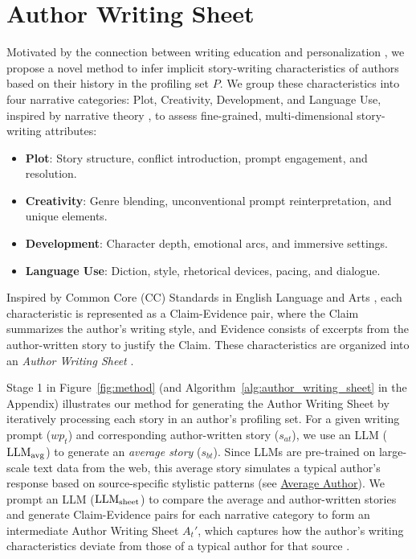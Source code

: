 \section{Author Writing Sheet}
\label{sec:author-writing-sheet}

Motivated by the connection between writing education and personalization \citep{li2023teach}, we propose a novel method to infer implicit story-writing characteristics of authors based on their history in the profiling set $P$. We group these characteristics into four narrative categories: Plot, Creativity, Development, and Language Use, inspired by narrative theory \citep{pavis1998dictionary, card1999characters, noble1994conflict, huot2024agents}, to assess fine-grained, multi-dimensional story-writing attributes:
\begin{itemize}[noitemsep, topsep=0pt]
    \item \textbf{Plot}: Story structure, conflict introduction, prompt engagement, and resolution.
    \item \textbf{Creativity}: Genre blending, unconventional prompt reinterpretation, and unique elements.
    \item \textbf{Development}: Character depth, emotional arcs, and immersive settings.
    \item \textbf{Language Use}: Diction, style, rhetorical devices, pacing, and dialogue.
\end{itemize}


Inspired by Common Core (CC) Standards in English Language and Arts \citep{national2010common}, each characteristic is represented as a Claim-Evidence pair, where the Claim summarizes the author's writing style, and Evidence consists of excerpts from the author-written story to justify the Claim. These characteristics are organized into an \emph{Author Writing Sheet} \citep{gurung-lapata-2024-chiron}.

Stage 1 in Figure~\ref{fig:method} (and Algorithm~\ref{alg:author_writing_sheet} in the Appendix) illustrates our method for generating the Author Writing Sheet by iteratively processing each story in an author's profiling set. For a given writing prompt ($wp_t$) and corresponding author-written story ($s_{at}$), we use an LLM (\(\text{LLM\textsubscript{avg}}\)) to generate an \emph{average story} ($s_{bt}$). Since LLMs are pre-trained on large-scale text data from the web, this average story simulates a typical author's response based on source-specific stylistic patterns 
(see \hyperlink{sec:avg-author}{Average Author}). We prompt an LLM (\(\text{LLM\textsubscript{sheet}}\)) to compare the average and author-written stories and generate Claim-Evidence pairs for each narrative category to form an intermediate Author Writing Sheet $A_t'$, which captures how the author's writing characteristics deviate from those of a typical author for that source \citep{shashidhar-etal-2024-unsupervised, krishna-etal-2020-reformulating}.



